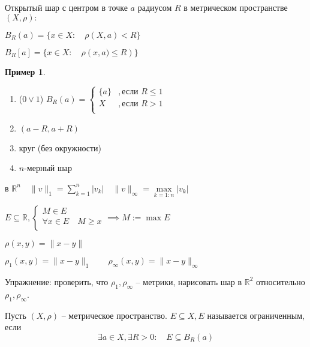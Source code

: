 \documentclass{book}
\newcommand\R{\ensuremath{\mathbb{R}}}
\theoremstyle{definition}
\newtheorem*{example}{Пример}
\begin{document}
    \begin{definition}
        Открытый шар с центром в точке $a$ радиусом $R$ в метрическом пространстве $\left( X,\rho \right) :$

        $B_R(a) = \{x\in X:\quad\rho(X,a)<R\}$

        $B_R[a] = \{x\in X:\quad \rho\left(x, a)\leqslant R  \right) \}$
    \end{definition}
    \begin{example}
        \begin{enumerate}
            \item ($0 \vee 1$) $B_R(a) = 
            \begin{cases}
                \{a\} &, \text{если } R\leqslant 1\\
                X&, \text{если } R>1\\
            \end{cases}$
            \item $(a-R,a+R)$
            \item круг (без окружности)
            \item $n$-мерный шар
        \end{enumerate}

        в $\R^n\quad \|v\|_1 = \sum_{k=1}^{n} |v_k|\quad \|v\|_{\infty } = \max\limits_{k=1:n} |v_k|$
    \end{example}
    \begin{definition}
        $E\subseteq \R, \begin{cases}
            M\in E\\
            \forall x\in E\quad 
            M\geqslant x\\
        \end{cases} \implies M:= \max E $
    \end{definition}

    $\rho(x,y) = \|x-y\|$

    $\rho_1(x,y) = \|x-y\|_1\qquad \rho_{\infty }(x,y) = \|x-y\|_{\infty }$

    Упражнение: проверить, что $\rho_1, \rho_{\infty}$ -- метрики, нарисовать шар в $\R^2$ относительно $\rho_1, \rho_{\infty}$.

    \begin{definition}
        Пусть $ (X, \rho)$ -- метрическое пространство.
        $E \subseteq X, E $ называется ограниченным, если  
        $$\exists a\in X, \exists R>0:\quad E\subseteq B_R(a) $$
    \end{definition}
\end{document}
